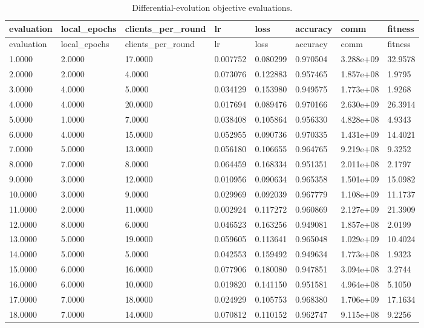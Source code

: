 \documentclass[11pt]{report}
\begin{document}
\begin{longtable}{llllllll}
\caption{Differential-evolution objective evaluations.}\\
\toprule
evaluation & local\_epochs & clients\_per\_round & lr & loss & accuracy & comm & fitness \\
\midrule
\endfirsthead
\toprule
evaluation & local\_epochs & clients\_per\_round & lr & loss & accuracy & comm & fitness \\
\midrule
\endhead
1.0000 & 2.0000 & 17.0000 & 0.007752 & 0.080299 & 0.970504 & 3.288e+09 & 32.9578 \\
2.0000 & 2.0000 & 4.0000 & 0.073076 & 0.122883 & 0.957465 & 1.857e+08 & 1.9795 \\
3.0000 & 4.0000 & 5.0000 & 0.034129 & 0.153980 & 0.949575 & 1.773e+08 & 1.9268 \\
4.0000 & 4.0000 & 20.0000 & 0.017694 & 0.089476 & 0.970166 & 2.630e+09 & 26.3914 \\
5.0000 & 1.0000 & 7.0000 & 0.038408 & 0.105864 & 0.956330 & 4.828e+08 & 4.9343 \\
6.0000 & 4.0000 & 15.0000 & 0.052955 & 0.090736 & 0.970335 & 1.431e+09 & 14.4021 \\
7.0000 & 5.0000 & 13.0000 & 0.056180 & 0.106655 & 0.964765 & 9.219e+08 & 9.3252 \\
8.0000 & 7.0000 & 8.0000 & 0.064459 & 0.168334 & 0.951351 & 2.011e+08 & 2.1797 \\
9.0000 & 3.0000 & 12.0000 & 0.010956 & 0.090634 & 0.965358 & 1.501e+09 & 15.0982 \\
10.0000 & 3.0000 & 9.0000 & 0.029969 & 0.092039 & 0.967779 & 1.108e+09 & 11.1737 \\
11.0000 & 2.0000 & 11.0000 & 0.002924 & 0.117272 & 0.960869 & 2.127e+09 & 21.3909 \\
12.0000 & 8.0000 & 6.0000 & 0.046523 & 0.163256 & 0.949081 & 1.857e+08 & 2.0199 \\
13.0000 & 5.0000 & 19.0000 & 0.059605 & 0.113641 & 0.965048 & 1.029e+09 & 10.4024 \\
14.0000 & 5.0000 & 5.0000 & 0.042553 & 0.159492 & 0.949634 & 1.773e+08 & 1.9323 \\
15.0000 & 6.0000 & 16.0000 & 0.077906 & 0.180080 & 0.947851 & 3.094e+08 & 3.2744 \\
16.0000 & 6.0000 & 10.0000 & 0.019820 & 0.141150 & 0.951581 & 4.964e+08 & 5.1050 \\
17.0000 & 7.0000 & 18.0000 & 0.024929 & 0.105753 & 0.968380 & 1.706e+09 & 17.1634 \\
18.0000 & 7.0000 & 14.0000 & 0.070812 & 0.110152 & 0.962747 & 9.115e+08 & 9.2256 \\

\end{longtable}
\end{document}
